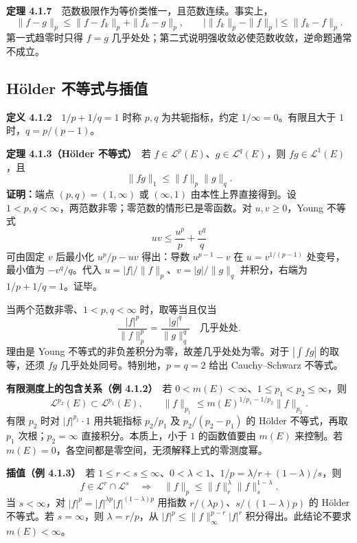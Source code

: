 \documentclass[11pt,a4paper]{article}
\begin{document}
\textbf{定理 4.1.7}　范数极限作为等价类惟一，且范数连续。事实上， \[
\|f-g\|_p\le\|f-f_k\|_p+\|f_k-g\|_p,\qquad
\bigl|\|f_k\|_p-\|f\|_p\bigr|\le\|f_k-f\|_p.
\] 第一式趋零时只得 \(f=g\)
几乎处处；第二式说明强收敛必使范数收敛，逆命题通常不成立。

\subsection{Hölder
不等式与插值}\label{ch04-s1-huxf6lder-ux4e0dux7b49ux5f0fux4e0eux63d2ux503c}

\textbf{定义 4.1.2}　\(1/p+1/q=1\) 时称 \(p,q\) 为共轭指标，约定
\(1/\infty=0\)。有限且大于 \(1\) 时，\(q=p/(p-1)\)。

\textbf{定理 4.1.3（Hölder 不等式）}　若
\(f\in\mathcal L^p(E)\)、\(g\in\mathcal L^q(E)\)，则
\(fg\in\mathcal L^1(E)\)，且 \[
\|fg\|_1\le\|f\|_p\|g\|_q.
\] \textbf{证明：}端点 \((p,q)=(1,\infty)\) 或 \((\infty,1)\)
由本性上界直接得到。设
\(1<p,q<\infty\)，两范数非零；零范数的情形已是零函数。对
\(u,v\ge0\)，Young 不等式 \[
uv\le\frac{u^p}{p}+\frac{v^q}{q}
\] 可由固定 \(v\) 后最小化 \(u^p/p-uv\) 得出：导数 \(u^{p-1}-v\) 在
\(u=v^{1/(p-1)}\) 处变号，最小值为 \(-v^q/q\)。代入
\(u=|f|/\|f\|_p\)、\(v=|g|/\|g\|_q\) 并积分，右端为
\(1/p+1/q=1\)。证毕。

当两个范数非零、\(1<p,q<\infty\) 时，取等当且仅当 \[
\frac{|f|^p}{\|f\|_p^p}=\frac{|g|^q}{\|g\|_q^q}\quad\text{几乎处处}.
\] 理由是 Young 不等式的非负差积分为零，故差几乎处处为零。对于
\(|\int fg|\) 的取等，还须 \(fg\) 几乎处处同号。特别地，\(p=q=2\) 给出
Cauchy--Schwarz 不等式。

\textbf{有限测度上的包含关系（例 4.1.2）}　若
\(0<m(E)<\infty\)、\(1\le p_1<p_2\le\infty\)，则 \[
\mathcal L^{p_2}(E)\subset\mathcal L^{p_1}(E),\qquad
\|f\|_{p_1}\le m(E)^{1/p_1-1/p_2}\|f\|_{p_2}.
\] 有限 \(p_2\) 时对 \(|f|^{p_1}\cdot1\) 用共轭指标 \(p_2/p_1\) 及
\(p_2/(p_2-p_1)\) 的 Hölder 不等式，再取 \(p_1\) 次根；\(p_2=\infty\)
直接积分。本质上，小于 \(1\) 的函数值要由 \(m(E)\) 来控制。若
\(m(E)=0\)，各空间都是零空间，无须解释上式的零测度幂。

\textbf{插值（例 4.1.3）}　若
\(1\le r<s\le\infty\)、\(0<\lambda<1\)、\(1/p=\lambda/r+(1-\lambda)/s\)，则
\[
f\in\mathcal L^r\cap\mathcal L^s
\quad\Longrightarrow\quad
\|f\|_p\le\|f\|_r^\lambda\|f\|_s^{1-\lambda}.
\] 当 \(s<\infty\)，对 \(|f|^p=|f|^{\lambda p}|f|^{(1-\lambda)p}\)
用指数 \(r/(\lambda p)\)、\(s/((1-\lambda)p)\) 的 Hölder 不等式。若
\(s=\infty\)，则 \(\lambda=r/p\)，从 \(|f|^p\le\|f\|_\infty^{p-r}|f|^r\)
积分得出。此结论不要求 \(m(E)<\infty\)。
\end{document}
